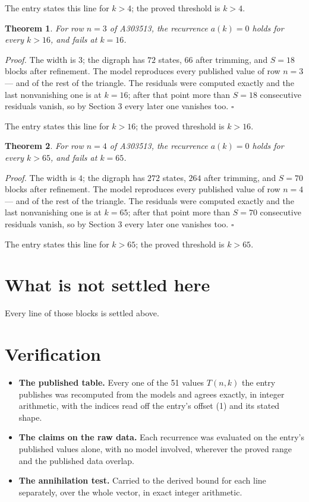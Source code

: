 \documentclass[11pt]{article}
\newtheorem{theorem}{Theorem}
\theoremstyle{definition}
\begin{document}
The entry states this line for $k > 4$; the proved threshold is $k > 4$.

\begin{theorem} For row $n = 3$ of A303513, the recurrence $a(k) = 0$ holds for every $k > 16$, and fails at $k = 16$.\end{theorem}

{\itshape Proof.} The width is $3$; the digraph has $72$ states, $66$ after trimming, and $S = 18$ blocks after refinement. The model reproduces every published value of row $n = 3$ --- and of the rest of the triangle. The residuals were computed exactly and the last nonvanishing one is at $k = 16$; after that point more than $S = 18$ consecutive residuals vanish, so by Section 3 every later one vanishes too. $\square$

The entry states this line for $k > 16$; the proved threshold is $k > 16$.

\begin{theorem} For row $n = 4$ of A303513, the recurrence $a(k) = 0$ holds for every $k > 65$, and fails at $k = 65$.\end{theorem}

{\itshape Proof.} The width is $4$; the digraph has $272$ states, $264$ after trimming, and $S = 70$ blocks after refinement. The model reproduces every published value of row $n = 4$ --- and of the rest of the triangle. The residuals were computed exactly and the last nonvanishing one is at $k = 65$; after that point more than $S = 70$ consecutive residuals vanish, so by Section 3 every later one vanishes too. $\square$

The entry states this line for $k > 65$; the proved threshold is $k > 65$.

\section{What is not settled here}

Every line of those blocks is settled above.

\section{Verification}

\begin{itemize}

\item {\bfseries The published table.} Every one of the 51 values $T(n,k)$ the entry publishes was recomputed from the models and agrees exactly, in integer arithmetic, with the indices read off the entry's offset (1) and its stated shape.

\item {\bfseries The claims on the raw data.} Each recurrence was evaluated on the entry's published values alone, with no model involved, wherever the proved range and the published data overlap.

\item {\bfseries The annihilation test.} Carried to the derived bound for each line separately, over the whole vector, in exact integer arithmetic.

\end{itemize}
\end{document}
